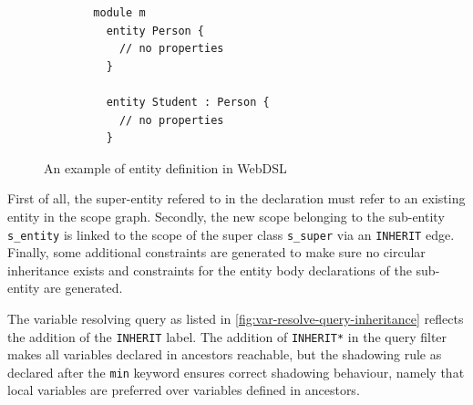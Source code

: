       \begin{figure}
        \begin{subfigure}[b]{0.1\textwidth}
          \begin{verbatim}
  module m
    entity Person {
      // no properties
    }

    entity Student : Person {
      // no properties
    }

          \end{verbatim}
          \caption{\label{fig:webdsl-entity-inheritance-example-webdsl}}
        \end{subfigure}
        \begin{subfigure}[b]{0.9\textwidth}
          \centering
          \caption{\label{fig:webdsl-entity-inheritance-example-sg}}
        \end{subfigure}
        \caption{\label{fig:webdsl-entity-inheritance-example}An example of entity definition in WebDSL}
      \end{figure}

      First of all, the super-entity refered to in the declaration must refer to an existing entity in the scope graph. Secondly, the new scope belonging to the sub-entity \texttt{s\_entity} is linked to the scope of the super class \texttt{s\_super} via an \texttt{INHERIT} edge. Finally, some additional constraints are generated to make sure no circular inheritance exists and constraints for the entity body declarations of the sub-entity are generated.

      The variable resolving query as listed in \cref{fig:var-resolve-query-inheritance} reflects the addition of the \texttt{INHERIT} label. The addition of \texttt{INHERIT*} in the query filter makes all variables declared in ancestors reachable, but the shadowing rule as declared after the \texttt{min} keyword ensures correct shadowing behaviour, namely that local variables are preferred over variables defined in ancestors.

